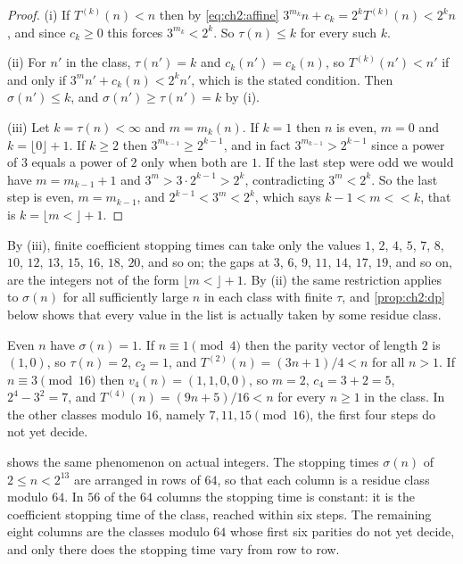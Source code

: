 \begin{proof}
(i) If $T^{(k)}(n)<n$ then by \eqref{eq:ch2:affine}
$3^{m_k}n+c_k=2^kT^{(k)}(n)<2^kn$, and since $c_k\geq0$ this forces
$3^{m_k}<2^k$. So $\tau(n)\leq k$ for every such $k$.

(ii) For $n'$ in the class, $\tau(n')=k$ and $c_k(n')=c_k(n)$, so
$T^{(k)}(n')<n'$ if and only if $3^mn'+c_k(n)<2^kn'$, which is the stated
condition. Then $\sigma(n')\leq k$, and $\sigma(n')\geq\tau(n')=k$ by (i).

(iii) Let $k=\tau(n)<\infty$ and $m=m_k(n)$. If $k=1$ then $n$ is even, $m=0$ and
$k=\lfloor0\rfloor+1$. If $k\geq2$ then $3^{m_{k-1}}\geq2^{k-1}$, and in fact
$3^{m_{k-1}}>2^{k-1}$ since a power of $3$ equals a power of $2$ only when
both are $1$. If the last step were odd we would have $m=m_{k-1}+1$ and
$3^m>3\cdot2^{k-1}>2^k$, contradicting $3^m<2^k$. So the last step is even,
$m=m_{k-1}$, and $2^{k-1}<3^m<2^k$, which says $k-1<m\lt<k$, that is
$k=\lfloor m\lt\rfloor+1$.
\end{proof}

By (iii), finite coefficient stopping times can take only the values $1$, $2$, $4$, $5$, $7$,
$8$, $10$, $12$, $13$, $15$, $16$, $18$, $20$, and so on; the gaps at $3$,
$6$, $9$, $11$, $14$, $17$, $19$, and so on, are the integers
not of the form $\lfloor m\lt\rfloor+1$. By (ii) the same restriction applies
to $\sigma(n)$ for all sufficiently large $n$ in each class with finite $\tau$,
and \cref{prop:ch2:dp} below shows that every value in the list is actually
taken by some residue class.

\begin{example}\label{ex:ch2:stop}
Even $n$ have $\sigma(n)=1$. If $n\equiv1\pmod4$ then the parity vector of length $2$ is $(1,0)$, so
$\tau(n)=2$, $c_2=1$, and $T^{(2)}(n)=(3n+1)/4<n$ for all $n>1$. If
$n\equiv3\pmod{16}$ then $v_4(n)=(1,1,0,0)$, so $m=2$, $c_4=3+2=5$,
$2^4-3^2=7$, and $T^{(4)}(n)=(9n+5)/16<n$ for every $n\geq1$ in the class. In
the other classes modulo $16$, namely $7,11,15\pmod{16}$, the first four
steps do not yet decide.
\end{example}

 shows the same phenomenon on actual integers. The
stopping times $\sigma(n)$ of $2\leq n<2^{13}$ are arranged in rows of $64$,
so that each column is a residue class modulo $64$. In $56$ of the $64$
columns the stopping time is constant: it is the coefficient stopping time
of the class, reached within six steps. The remaining eight columns are the
classes modulo $64$ whose first six parities do not yet decide, and only there
does the stopping time vary from row to row.

